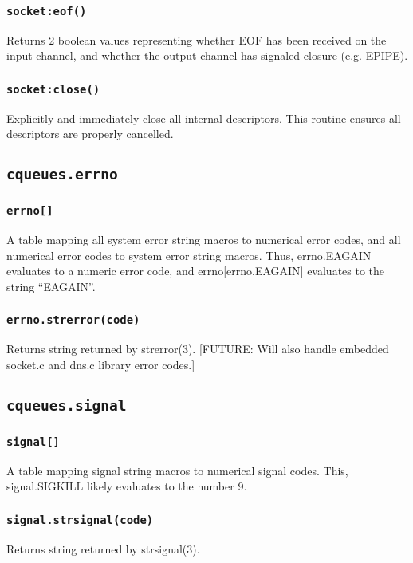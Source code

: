 \documentclass[11pt, oneside]{memoir}
\newcommand*{\fn}[1]{\texttt{#1}\xspace}
\newcommand*{\module}[1]{\texttt{#1}\xspace}
\begin{document}
\subsubsection[\fn{socket:eof}]{\fn{socket:eof()}}
Returns 2 boolean values representing whether EOF has been received on the input channel, and whether the output channel has signaled closure (e.g. EPIPE).

\subsubsection[\fn{socket:close}]{\fn{socket:close()}}
Explicitly and immediately close all internal descriptors. This routine ensures all descriptors are properly cancelled.

\subsection{\module{cqueues.errno}}

\subsubsection[\fn{errno[]}]{\fn{errno[]}}
A table mapping all system error string macros to numerical error codes, and all numerical error codes to system error string macros. Thus, errno.EAGAIN evaluates to a numeric error code, and errno[errno.EAGAIN] evaluates to the string ``EAGAIN''.

\subsubsection[\fn{errno.strerror}]{\fn{errno.strerror(code)}}
Returns string returned by strerror(3). [FUTURE: Will also handle embedded socket.c and dns.c library error codes.]

\subsection{\module{cqueues.signal}}

\subsubsection{\fn{signal[]}}
A table mapping signal string macros to numerical signal codes.
This, signal.SIGKILL likely evaluates to the number 9.

\subsubsection[\fn{signal.strsignal}]{\fn{signal.strsignal(code)}}
Returns string returned by strsignal(3).
\end{document}
